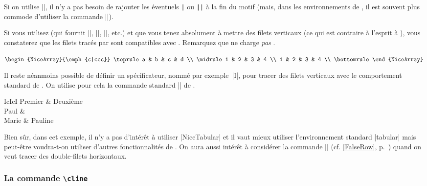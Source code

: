 \documentclass[dvipsnames]{article}
\begin{document}
\medskip
Si on utilise |\multicolumn|, il n'y a pas besoin de rajouter les éventuels
\verb+|+ ou \verb+||+ à la fin du motif (mais, dans les environnements de
, il est souvent plus commode d'utiliser la commande |\Block|).


\medskip
{}
Si vous utilisez  (qui fournit |\toprule|, |\midrule|,
|\bottomrule|, etc.) et que vous tenez absolument à mettre des filets verticaux
(ce qui est contraire à l'esprit à ), vous constaterez que les
filets tracés par  sont compatibles avec .
Remarquez que  ne charge \emph{pas} .

\medskip
\begin{Code}[width=10.5cm,show-output,no-cell-nodes]
$\begin{NiceArray}{\emph{c|ccc}} \toprule
a & b & c & d \\ \midrule
1 & 2 & 3 & 4 \\
1 & 2 & 3 & 4 \\ \bottomrule
\end{NiceArray}$
\end{Code}

\medskip
Il reste néanmoins possible de définir un spécificateur, nommé par
exemple~|I|, pour tracer des filets verticaux avec le comportement standard de .
On utilise pour cela la commande standard |\newcolumntype| de .

\medskip
\begin{Code}[width=10cm,show-output,no-cell-nodes]
\emph{\newcolumntype{I}{!{\vrule}}}
\begin{NiceTabular}{IcIcI} \hline
Premier & Deuxième \\ \hline\hline
Paul  & \\ \hline
Marie & Pauline \\ \hline
\end{NiceTabular}
\end{Code}


\medskip
Bien sûr, dans cet exemple, il n'y a pas d'intérêt à utiliser |{NiceTabular}| et
il vaut mieux utiliser l'environnement standard |{tabular}| mais peut-être voudra-t-on
utiliser d'autres fonctionnalités de . On aura aussi intérêt à considérer
la commande |\FalseRow| (cf. \ref{FalseRow}, p.~\pageref{FalseRow}) quand on veut
tracer des double-filets horizontaux.


\subsubsection{La commande  \texttt{\textbackslash cline}}
\end{document}
